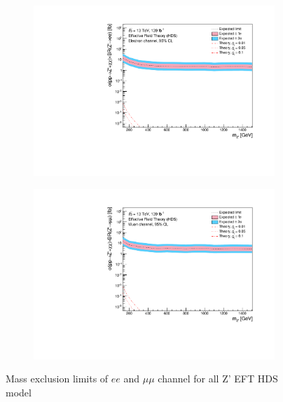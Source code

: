 \documentclass[12pt, a4paper]{book}
\begin{document}
\begin{figure}[!ht]
	\centering
   \begin{subfigure}[b]{0.49\textwidth}
      \centering
      \includegraphics[width=1\textwidth]{Limits/EFT_HDS/mass_exclusion_ee.pdf}
      \end{subfigure}
   \hfill
   \begin{subfigure}[b]{0.49\textwidth}
      \centering
      \includegraphics[width=1\textwidth]{Limits/EFT_HDS/mass_exclusion_uu.pdf}
      \end{subfigure}
   \caption{Mass exclusion limits of $ee$ and $\mu\mu$ channel for all Z' EFT HDS model}\label{fig:EFT_HDS_exclusion_ee_uu}
\end{figure}
\clearpage
\end{document}
